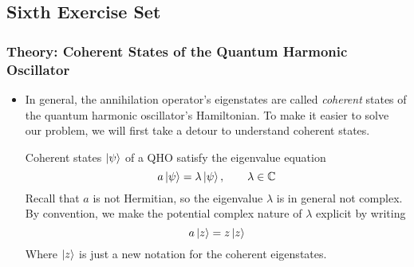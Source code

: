 \documentclass[11pt, a4paper]{article}
\begin{document}
\subsection{Sixth Exercise Set}

\subsubsection{Theory: Coherent States of the Quantum Harmonic Oscillator}
\begin{itemize}
	\item In general, the annihilation operator's eigenstates are called \textit{coherent} states of the quantum harmonic oscillator's Hamiltonian. To make it easier to solve our problem, we will first take a detour to understand coherent states. 
	
	Coherent states  $ \ket{\psi} $ of a QHO satisfy the eigenvalue equation
	\begin{equation*}
		a \ket{\psi} = \lambda \ket{\psi}, \qquad \lambda \in \mathbb{C}
	\end{equation*}
	Recall that $ a $ is not Hermitian, so the eigenvalue $ \lambda $ is in general not complex. By convention, we make the potential complex nature of $ \lambda $ explicit by writing 
	\begin{equation*}
		a \ket{z} = z \ket{z}
	\end{equation*}
	Where $ \ket{z} $ is just a new notation for the coherent eigenstates. 
	

\end{itemize}
\end{document}
